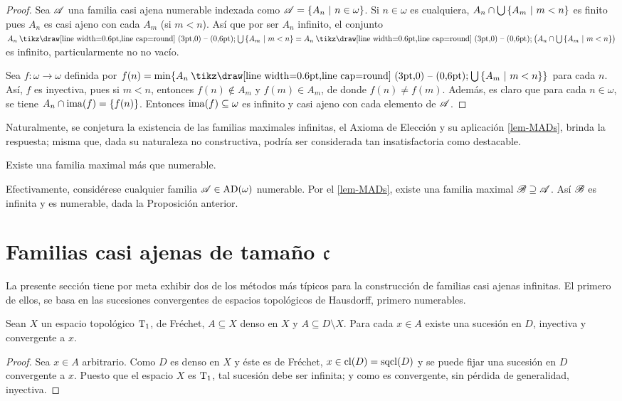  \begin{proof}
  Sea $\mathscr{A}$ una familia casi ajena numerable indexada como $\mathscr{A}=\{A_n \text{ $|$ } n \in \omega\}$. Si $n \in \omega$ es cualquiera, $A_n \cap \mbox{$\bigcup$}\, \{A_m \text{ $|$ } m< n\}$ es finito pues $A_n$ es casi ajeno con cada $A_m$ (si $m<n$). Así que por ser $A_n$ infinito, el conjunto $A_n \setminus \midcup \{A_m \tq m<n\} = A_n \setminus \big( A_n \cap \midcup \{A_m \tq m<n\} \big)$ es infinito, particularmente no no vacío.

  Sea $f:\omega \to \omega$ definida por $f(n) = \min\{A_n \setminus \midcup \{A_m \tq m<n\}\}$ para cada $n$. Así, $f$ es inyectiva, pues si $m<n$, entonces $f(n) \notin A_m$ y $f(m) \in A_m$, de donde $f(n) \neq f(m)$. Además, es claro que para cada $n \in \omega$, se tiene $A_n \cap \operatorname{ima}(f) = \{f(n)\}$. Entonces $\operatorname{ima}(f) \subseteq \omega$ es infinito y casi ajeno con cada elemento de $\mathscr{A}$.
 \end{proof}

 Naturalmente, se conjetura la existencia de las familias maximales infinitas, el Axioma de Elección y su aplicación \ref{lem-MADs}, brinda la respuesta; misma que, dada su naturaleza no constructiva, podría ser considerada tan insatisfactoria como destacable.

 \begin{observacion}\label{obs-ExisteNoNumMAD}
  Existe una familia maximal más que numerable.

  Efectivamente, considérese cualquier familia $\mathscr{A} \in \operatorname{AD}(\omega)$ numerable. Por el \autoref{lem-MADs}, existe una familia maximal $\mathscr{B} \supseteq \mathscr{A}$. Así $\mathscr{B}$ es infinita y es numerable, dada la Proposición anterior.
 \end{observacion}

 \section{Familias casi ajenas de tamaño \texorpdfstring{$\mathfrak{c}$}{c}}

 La presente sección tiene por meta exhibir dos de los métodos más típicos para la construcción de familias casi ajenas infinitas. El primero de ellos, se basa en las sucesiones convergentes de espacios topológicos de Hausdorff, primero numerables.

 \begin{lema}
  Sean $X$ un espacio topológico $\operatorname{T}_1$, de Fréchet, $A\subseteq X$ denso en $X$ y $A \subseteq D \setminus X$. Para cada $x \in A$ existe una sucesión en $D$, inyectiva y convergente a $x$.
 \end{lema}
 \begin{proof}
  Sea $x\in A$ arbitrario. Como $D$ es denso en $X$ y éste es de Fréchet, $x \in \operatorname{cl}(D)=\operatorname{sqcl}(D)$ y se puede fijar una sucesión en $D$ convergente a $x$. Puesto que el espacio $X$ es $\operatorname{T}_1$, tal sucesión debe ser infinita; y como es convergente, sin pérdida de generalidad, inyectiva.
 \end{proof}

